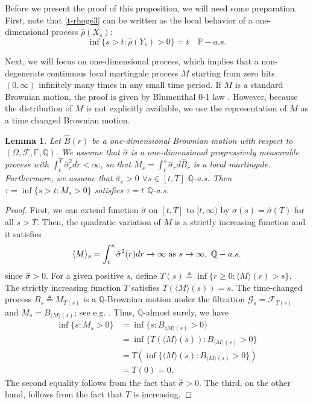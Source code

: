 \documentclass[11pt,reqno]{amsart}
\numberwithin{equation}{section}
\newtheorem{lem}{Lemma}[section]
\renewcommand{\P}{\mathbb{P}}
\begin{document}
Before we present the proof of this proposition, we will need some preparation. 
First, note that \eqref{t-rhoge3} can be
written as the local behavior of a one-dimensional process $\hat \rho(X_s)$:
\begin{equation*}
  \inf\{s>t: \hat \rho(Y_s) >0\} = t \quad  \P-a.s.
\end{equation*}

Next, we will focus on one-dimensional process, which implies that a
non-degenerate continuous local martingale process $M$ 
starting from zero hits $(0,\infty)$ infinitely many times in any
small time period. If $M$ is a standard Brownian motion, the proof 
is given by Blumenthal 0-1 law \cite[Theorem 7.2.6]{Dur05}. However,
because the distribution of $M$ is not explicitly available, we use the representation of $M$ as a time changed Brownian motion.

\begin{lem} \label{t-mtgl}
Let $\hat B(r)$ be a one-dimensional Brownian motion with
respect to $(\Omega, \mathcal{F}, \mathbb{F}, \mathbb{Q})$.  We assume
that $\hat \sigma$ 
is a one-dimensional progressively measurable process with $\int_t^T
\hat\sigma_r^2 dr <\infty$, so that   $M_s = \int_t^s \hat \sigma_r
d \hat B_r$ is a local martingale.   
Furthermore, we assume that $\hat \sigma_s>0$ $\forall s\in [t, T]$
$\mathbb{Q}$-a.s.  Then 
$\tau = \inf \{s>t: M_s>0\}$ satisfies $\tau=t$ $\mathbb{Q}$-a.s.
\end{lem}
\begin{proof}
First, we can extend function $\hat \sigma$ on $[t,T]$ to $[t,\infty)$
by $\hat \sigma(s) = \hat \sigma (T)$ for all $s>T$. Then, the
quadratic variation of $M$ is a strictly increasing function and it satisfies
$$\langle M \rangle_s = \int_t^s \hat \sigma^2 (r) dr \to \infty \hbox{ as
} s \to \infty, \ \mathbb{Q}-a.s.$$
since $\hat \sigma>0$.  For a given positive $s$, define $T(s) \triangleq
\inf\{ r\ge 0: \langle M \rangle(r) >s \}.$ 
The strictly increasing function $T$ satisfies
$ T\left(\langle M \rangle(s)\right) = s.$
The time-changed process $B_s \triangleq M_{T(s)}$
is a $\mathbb{Q}$-Brownian motion under the filtration $\mathcal{G}_s =
\mathcal{F}_{T(s)}$ and $M_s=B_{\langle M \rangle (s)}$; see
e.g. \cite[Theorem 3.4.6]{KS91}. Thus, $\mathbb{Q}$-almost surely, we have
$$\begin{array}{ll} 
\inf\{s: M_s>0\} & 
= \inf\{s: B_{\langle M\rangle(s)}>0\} 
\\& =  \inf\{T \left(\langle M \rangle (s)\right): B_{\langle
  M\rangle(s)}>0\} 
\\& = T\left( \inf\{ \langle M \rangle (s): B_{\langle
  M\rangle(s)}>0\}\right)
\\& = T
(0) = 0. \end{array} $$
The second equality follows from the fact that $\hat\sigma>0$.
The third, on the other hand, follows from the fact that $T$ is increasing.
\end{proof}
\end{document}
